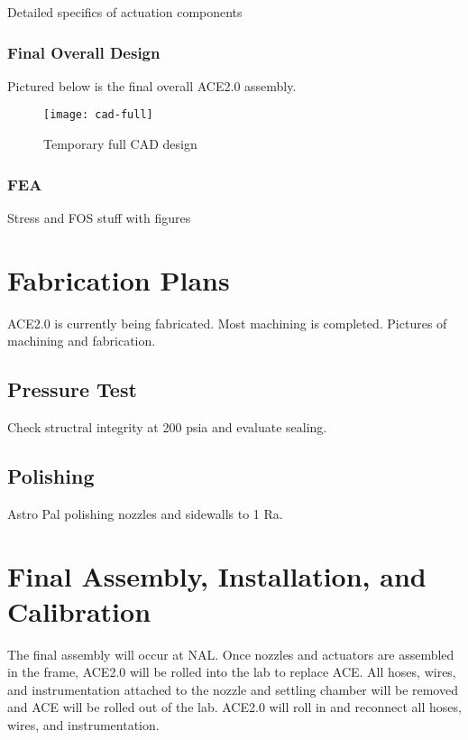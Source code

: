 Detailed specifics of actuation components

\subsubsection{Final Overall Design}

Pictured below is the final overall ACE2.0 assembly.

\begin{figure}[ht]
    \centering
    \texttt{[image: cad-full]}
    \caption{Temporary full CAD design}
    \label{fig:cad-full}
\end{figure}

\subsubsection{FEA}

Stress and FOS stuff with figures

\section{Fabrication Plans}

ACE2.0 is currently being fabricated. Most machining is completed. Pictures of machining and fabrication.

\subsection{Pressure Test}

Check structral integrity at 200 psia and evaluate sealing.

\subsection{Polishing}

Astro Pal polishing nozzles and sidewalls to 1 Ra.

\section{Final Assembly, Installation, and Calibration}

The final assembly will occur at NAL. Once nozzles and actuators are assembled in the frame, ACE2.0 will be rolled into the lab to replace ACE. All hoses, wires, and instrumentation attached to the nozzle and settling chamber will be removed and ACE will be rolled out of the lab. ACE2.0 will roll in and reconnect all hoses, wires, and instrumentation.


